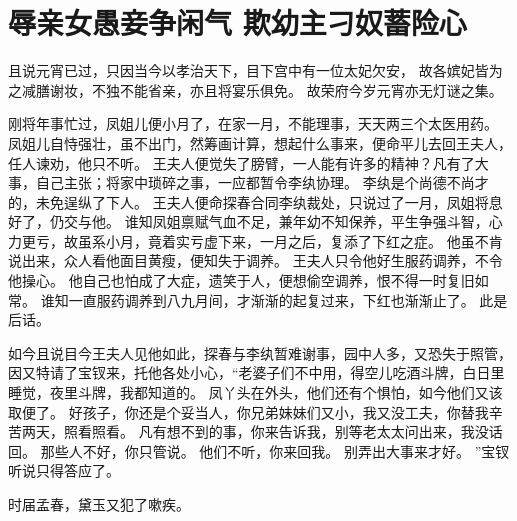 \chapter{辱亲女愚妾争闲气 \quad 欺幼主刁奴蓄险心}
\par
且说元宵已过，只因当今以孝治天下，目下宫中有一位太妃欠安，
故各嫔妃皆为之减膳谢妆，不独不能省亲，亦且将宴乐俱免。
故荣府今岁元宵亦无灯谜之集。
\par
刚将年事忙过，凤姐儿便小月了，在家一月，不能理事，天天两三个太医用药。
凤姐儿自恃强壮，虽不出门，然筹画计算，想起什么事来，便命平儿去回王夫人，任人谏劝，他只不听。
王夫人便觉失了膀臂，一人能有许多的精神？凡有了大事，自己主张；将家中琐碎之事，一应都暂令李纨协理。
李纨是个尚德不尚才的，未免逞纵了下人。
王夫人便命探春合同李纨裁处，只说过了一月，凤姐将息好了，仍交与他。
谁知凤姐禀赋气血不足，兼年幼不知保养，平生争强斗智，心力更亏，故虽系小月，竟着实亏虚下来，一月之后，复添了下红之症。
他虽不肯说出来，众人看他面目黄瘦，便知失于调养。
王夫人只令他好生服药调养，不令他操心。
他自己也怕成了大症，遗笑于人，便想偷空调养，恨不得一时复旧如常。
谁知一直服药调养到八九月间，才渐渐的起复过来，下红也渐渐止了。
此是后话。
\par
如今且说目今王夫人见他如此，探春与李纨暂难谢事，园中人多，又恐失于照管，因又特请了宝钗来，托他各处小心，“老婆子们不中用，得空儿吃酒斗牌，白日里睡觉，夜里斗牌，我都知道的。
凤丫头在外头，他们还有个惧怕，如今他们又该取便了。
好孩子，你还是个妥当人，你兄弟妹妹们又小，我又没工夫，你替我辛苦两天，照看照看。
凡有想不到的事，你来告诉我，别等老太太问出来，我没话回。
那些人不好，你只管说。
他们不听，你来回我。
别弄出大事来才好。
”宝钗听说只得答应了。
\par
时届孟春，黛玉又犯了嗽疾。
